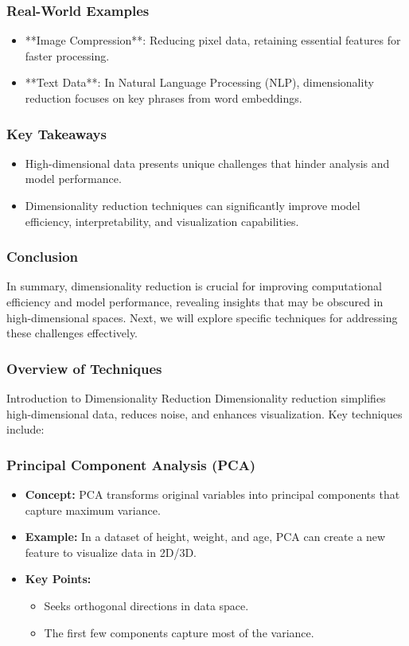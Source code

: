 \documentclass[aspectratio=169]{beamer}
\begin{document}
\begin{frame}[fragile]
    \frametitle{Real-World Examples}
    \begin{itemize}
        \item **Image Compression**: Reducing pixel data, retaining essential features for faster processing.
        \item **Text Data**: In Natural Language Processing (NLP), dimensionality reduction focuses on key phrases from word embeddings.
    \end{itemize}
\end{frame}

\begin{frame}[fragile]
    \frametitle{Key Takeaways}
    \begin{itemize}
        \item High-dimensional data presents unique challenges that hinder analysis and model performance.
        \item Dimensionality reduction techniques can significantly improve model efficiency, interpretability, and visualization capabilities.
    \end{itemize}
\end{frame}

\begin{frame}[fragile]
    \frametitle{Conclusion}
    In summary, dimensionality reduction is crucial for improving computational efficiency and model performance, revealing insights that may be obscured in high-dimensional spaces. Next, we will explore specific techniques for addressing these challenges effectively.
\end{frame}

\begin{frame}[fragile]
    \frametitle{Overview of Techniques}
    \begin{block}{Introduction to Dimensionality Reduction}
        Dimensionality reduction simplifies high-dimensional data, reduces noise, and enhances visualization. Key techniques include:
    \end{block}
\end{frame}

\begin{frame}[fragile]
    \frametitle{Principal Component Analysis (PCA)}
    \begin{itemize}
        \item \textbf{Concept:} PCA transforms original variables into principal components that capture maximum variance.
        \item \textbf{Example:} In a dataset of height, weight, and age, PCA can create a new feature to visualize data in 2D/3D.
        \item \textbf{Key Points:}
        \begin{itemize}
            \item Seeks orthogonal directions in data space.
            \item The first few components capture most of the variance.
        \end{itemize}
    \end{itemize}
\end{frame}
\end{document}
